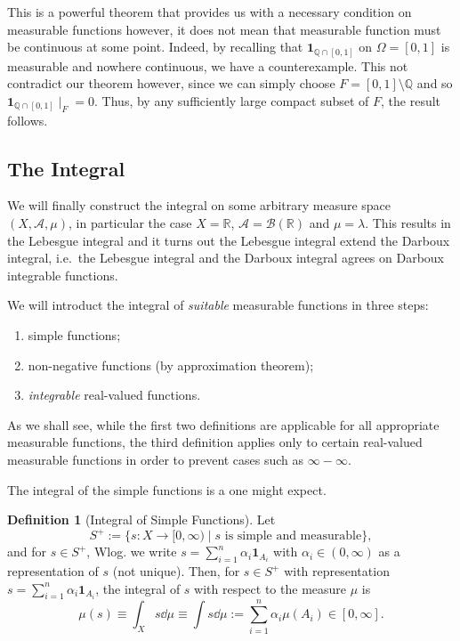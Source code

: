 \documentclass[
]{article}
\theoremstyle{definition}
\theoremstyle{definition}
\newtheorem{definition}{Definition}[section]
\begin{document}
This is a powerful theorem that provides us with a necessary condition
on measurable functions however, it does not mean that measurable
function must be continuous at some point. Indeed, by recalling that
\(\mathbf{1}_{\mathbb{Q} \cap [0, 1]}\) on \(\Omega = [0, 1]\) is
measurable and nowhere continuous, we have a counterexample. This not
contradict our theorem however, since we can simply choose
\(F = [0, 1] \setminus \mathbb{Q}\) and so
\(\mathbf{1}_{\mathbb{Q} \cap [0, 1]} \mid_F = 0\). Thus, by any
sufficiently large compact subset of \(F\), the result follows.

\hypertarget{the-integral}{%
\subsection{The Integral}\label{the-integral}}

We will finally construct the integral on some arbitrary measure space
\((X, \mathcal{A}, \mu)\), in particular the case \(X = \mathbb{R}\),
\(\mathcal{A} = \mathcal{B}(\mathbb{R})\) and \(\mu = \lambda\). This
results in the Lebesgue integral and it turns out the Lebesgue integral
extend the Darboux integral, i.e.~the Lebesgue integral and the Darboux
integral agrees on Darboux integrable functions.

We will introduct the integral of \emph{suitable} measurable functions
in three steps:

\begin{enumerate}
  \item simple functions;
  \item non-negative functions (by approximation theorem);
  \item \textit{integrable} real-valued functions.
\end{enumerate}

As we shall see, while the first two definitions are applicable for all
appropriate measurable functions, the third definition applies only to
certain real-valued measurable functions in order to prevent cases such
as \(\infty - \infty\).

The integral of the simple functions is a one might expect.

\begin{definition}[Integral of Simple Functions]
  Let 
  \[S^+ := \{s : X \to [0, \infty) \mid s \text{ is simple and measurable}\},\]
  and for \(s \in S^+\), Wlog. we write \(s = \sum_{i = 1}^n \alpha_i \mathbf{1}_{A_i}\) 
  with \(\alpha_i \in (0, \infty)\) as a representation of \(s\) (not unique). 
  Then, for \(s \in S^+\) with representation \(s = \sum_{i = 1}^n \alpha_i \mathbf{1}_{A_i}\), 
  the integral of \(s\) with respect to the measure \(\mu\) is 
  \[\mu(s) \equiv \int_X s \dd \mu \equiv \int s \dd \mu := 
    \sum_{i = 1}^n \alpha_i \mu(A_i) \in [0, \infty].\]
\end{definition}
\end{document}
